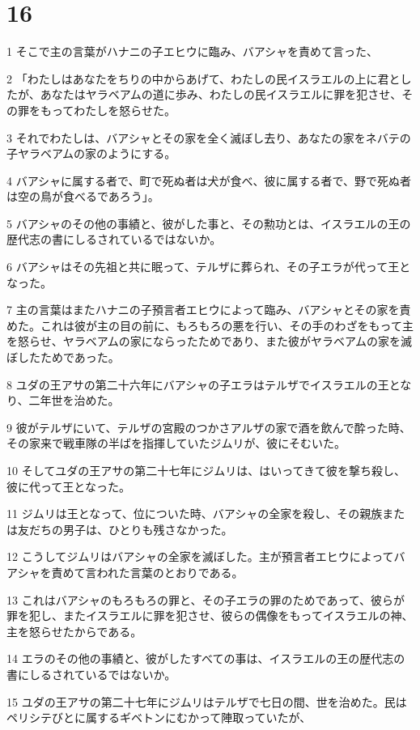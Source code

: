 \chapter{16}

\par 1 そこで主の言葉がハナニの子エヒウに臨み、バアシャを責めて言った、
\par 2 「わたしはあなたをちりの中からあげて、わたしの民イスラエルの上に君としたが、あなたはヤラベアムの道に歩み、わたしの民イスラエルに罪を犯させ、その罪をもってわたしを怒らせた。
\par 3 それでわたしは、バアシャとその家を全く滅ぼし去り、あなたの家をネバテの子ヤラベアムの家のようにする。
\par 4 バアシャに属する者で、町で死ぬ者は犬が食べ、彼に属する者で、野で死ぬ者は空の鳥が食べるであろう」。
\par 5 バアシャのその他の事績と、彼がした事と、その勲功とは、イスラエルの王の歴代志の書にしるされているではないか。
\par 6 バアシャはその先祖と共に眠って、テルザに葬られ、その子エラが代って王となった。
\par 7 主の言葉はまたハナニの子預言者エヒウによって臨み、バアシャとその家を責めた。これは彼が主の目の前に、もろもろの悪を行い、その手のわざをもって主を怒らせ、ヤラベアムの家にならったためであり、また彼がヤラベアムの家を滅ぼしたためであった。
\par 8 ユダの王アサの第二十六年にバアシャの子エラはテルザでイスラエルの王となり、二年世を治めた。
\par 9 彼がテルザにいて、テルザの宮殿のつかさアルザの家で酒を飲んで酔った時、その家来で戦車隊の半ばを指揮していたジムリが、彼にそむいた。
\par 10 そしてユダの王アサの第二十七年にジムリは、はいってきて彼を撃ち殺し、彼に代って王となった。
\par 11 ジムリは王となって、位についた時、バアシャの全家を殺し、その親族または友だちの男子は、ひとりも残さなかった。
\par 12 こうしてジムリはバアシャの全家を滅ぼした。主が預言者エヒウによってバアシャを責めて言われた言葉のとおりである。
\par 13 これはバアシャのもろもろの罪と、その子エラの罪のためであって、彼らが罪を犯し、またイスラエルに罪を犯させ、彼らの偶像をもってイスラエルの神、主を怒らせたからである。
\par 14 エラのその他の事績と、彼がしたすべての事は、イスラエルの王の歴代志の書にしるされているではないか。
\par 15 ユダの王アサの第二十七年にジムリはテルザで七日の間、世を治めた。民はペリシテびとに属するギベトンにむかって陣取っていたが、
